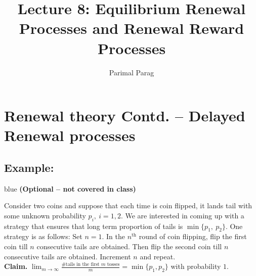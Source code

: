 \documentclass[a4paper,10pt]{article}
\title{Lecture 8: Equilibrium Renewal Processes and Renewal Reward Processes}
\author{Parimal Parag}
\begin{document}
\maketitle
\section{Renewal theory Contd. -- Delayed Renewal processes }

\subsection{Example:}

\begin{color}{blue} {\bf (Optional -- not covered in class)} \end{color}

Consider two coins and suppose  that each time is coin flipped, it lands tail with some unknown probability $p_i,~i=1,2.$ We are interested in coming up with a strategy that ensures that long term proportion of tails is $\min\{p_1,~p_2\}.$ One strategy is as follows: Set $n = 1$. In the $n^\text{th}$ round of coin flipping, flip the first coin till $n$ consecutive tails are obtained. Then flip the second coin till $n$ consecutive tails are obtained. Increment $n$ and repeat. \\

{\bf Claim.} $\lim_{m \to \infty} \frac{\# \mbox{tails in the first
    $m$ tosses}}{m} = \min\{p_1, p_2\}$ with probability $1$.\\
\end{document}
